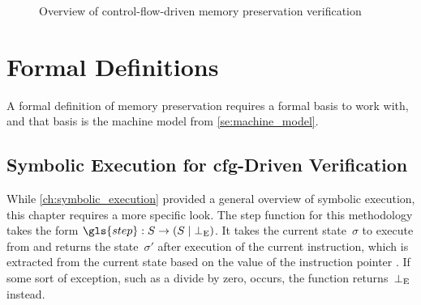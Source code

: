 \begin{figure}
  \centering
  \caption{Overview of control-flow-driven memory preservation verification}\label{fig:cfg_overview}
\end{figure}

\section{Formal Definitions}\label{se:cfg_defs}
A formal definition of memory preservation requires a formal basis to work with,
and that basis is the machine model from \cref{se:machine_model}.

\subsection{Symbolic Execution for \acs*{cfg}-Driven Verification}\label{cfg_symb_exec}
While \cref{ch:symbolic_execution} provided a general overview of symbolic execution,
this chapter requires a more specific look.
The step function for this methodology takes the form
$\gls{step}:S\rightarrow(S\mid\err)$.%
It takes the current state~$\sigma$ to execute from
and returns the state~$\sigma'$ after execution of the current instruction,
which is extracted from the current state based on the value of the instruction pointer
.
If some sort of exception, such as a divide by zero, occurs,
the function returns~$\bot_\mathrm{E}$ instead.


